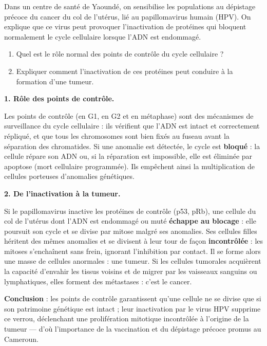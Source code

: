 \documentclass[11pt]{article}
\newcommand{\cle}[1]{{\popxbold\color{popdark}#1}}
\begin{document}
\begin{exoresolu}
Dans un centre de santé de Yaoundé, on sensibilise les populations au dépistage précoce du cancer du col de l'utérus, lié au papillomavirus humain (HPV). On explique que ce virus peut provoquer l'inactivation de protéines qui bloquent normalement le cycle cellulaire lorsque l'ADN est endommagé.
\begin{enumerate}
\item Quel est le rôle normal des points de contrôle du cycle cellulaire ?
\item Expliquer comment l'inactivation de ces protéines peut conduire à la formation d'une tumeur.
\end{enumerate}
\tcblower
\textbf{1. Rôle des points de contrôle.}

Les points de contrôle (en G1, en G2 et en métaphase) sont des mécanismes de surveillance du cycle cellulaire : ils vérifient que l'ADN est intact et correctement répliqué, et que tous les chromosomes sont bien fixés au fuseau avant la séparation des chromatides. Si une anomalie est détectée, le cycle est \textbf{bloqué} : la cellule répare son ADN ou, si la réparation est impossible, elle est éliminée par \cle{apoptose} (mort cellulaire programmée). Ils empêchent ainsi la multiplication de cellules porteuses d'anomalies génétiques.

\textbf{2. De l'inactivation à la tumeur.}

Si le papillomavirus inactive les protéines de contrôle (p53, pRb), une cellule du col de l'utérus dont l'ADN est endommagé ou muté \textbf{échappe au blocage} : elle poursuit son cycle et se divise par mitose malgré ses anomalies. Ses cellules filles héritent des mêmes anomalies et se divisent à leur tour de façon \textbf{incontrôlée} : les mitoses s'enchaînent sans frein, ignorant l'inhibition par contact. Il se forme alors une masse de cellules anormales : une \cle{tumeur}. Si les cellules tumorales acquièrent la capacité d'envahir les tissus voisins et de migrer par les vaisseaux sanguins ou lymphatiques, elles forment des \cle{métastases} : c'est le cancer.

\textbf{Conclusion} : les points de contrôle garantissent qu'une cellule ne se divise que si son patrimoine génétique est intact ; leur inactivation par le virus HPV supprime ce verrou, déclenchant une prolifération mitotique incontrôlée à l'origine de la tumeur — d'où l'importance de la vaccination et du dépistage précoce promus au Cameroun.
\end{exoresolu}
\end{document}
